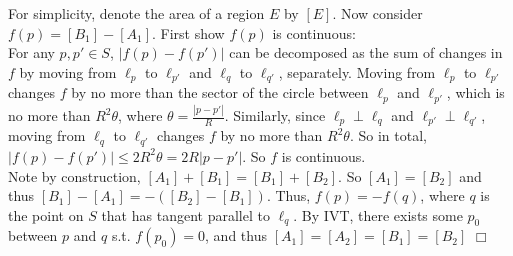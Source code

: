 \documentclass{article}
\begin{document}


\noindent For simplicity, denote the area of a region $E$ by $[E]$. Now consider $f(p) = [B_1] - [A_1]$. First show $f(p)$ is continuous:\\
For any $p,p'\in S$, $|f(p)-f(p')|$ can be decomposed as the sum of changes in $f$ by moving from $\ell_p$ to $\ell_{p'}$ and $\ell_q$ to $\ell_{q'}$, separately. Moving from $\ell_p$ to $\ell_{p'}$ changes $f$ by no more than the sector of the circle between $\ell_p$ and $\ell_{p'}$, which is no more than $R^2\theta$, where $\theta = \frac{|p-p'|}{R}$. Similarly, since $\ell_p \perp \ell_q$ and $\ell_{p'} \perp \ell_{q'}$, moving from $\ell_q$ to $\ell_{q'}$ changes $f$ by no more than $R^2\theta$. So in total, $|f(p)-f(p')| \leq 2R^2\theta = 2R|p-p'|$. So $f$ is continuous.\\
Note by construction, $[A_1] + [B_1] = [B_1] + [B_2]$. So $[A_1] = [B_2]$ and thus $[B_1] - [A_1] = -([B_2] - [B_1])$. Thus, $f(p) = -f(q)$, where $q$ is the point on $S$ that has tangent parallel to $\ell_q$. By IVT, there exists some $p_0$ between $p$ and $q$ s.t. $f(p_0) = 0$, and thus $[A_1] = [A_2] = [B_1] = [B_2]$ $\Box$
\end{document}
